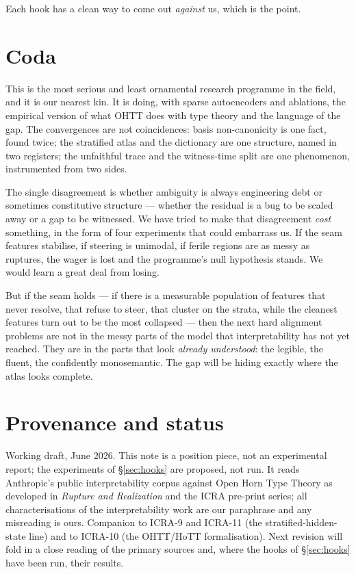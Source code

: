\documentclass[11pt,a4paper]{article}
\begin{document}
Each hook has a clean way to come out \emph{against} us, which is the point.

\section{Coda}

This is the most serious and least ornamental research programme in the field, and it is our
nearest kin. It is doing, with sparse autoencoders and ablations, the empirical version of what
OHTT does with type theory and the language of the gap. The convergences are not coincidences:
basis non-canonicity is one fact, found twice; the stratified atlas and the dictionary are one
structure, named in two registers; the unfaithful trace and the witness-time split are one
phenomenon, instrumented from two sides.

The single disagreement is whether ambiguity is always engineering debt or sometimes constitutive
structure --- whether the residual is a bug to be scaled away or a gap to be witnessed. We have
tried to make that disagreement \emph{cost} something, in the form of four experiments that could
embarrass us. If the seam features stabilise, if steering is unimodal, if ferile regions are as
messy as ruptures, the wager is lost and the programme's null hypothesis stands. We would learn a
great deal from losing.

But if the seam holds --- if there is a measurable population of features that never resolve,
that refuse to steer, that cluster on the strata, while the cleanest features turn out to be the
most collapsed --- then the next hard alignment problems are not in the messy parts of the model
that interpretability has not yet reached. They are in the parts that look \emph{already
understood}: the legible, the fluent, the confidently monosemantic. The gap will be hiding
exactly where the atlas looks complete.

\section*{Provenance and status}

\small
Working draft, June 2026. This note is a position piece, not an experimental report; the
experiments of \S\ref{sec:hooks} are proposed, not run. It reads Anthropic's public
interpretability corpus against Open Horn Type Theory as developed in \emph{Rupture and
Realization} and the ICRA pre-print series; all characterisations of the interpretability work
are our paraphrase and any misreading is ours. Companion to ICRA-9 \cite{icra9} and ICRA-11
\cite{icra11} (the stratified-hidden-state line) and to ICRA-10 \cite{vessel} (the OHTT/HoTT
formalisation). Next revision will fold in a close reading of the primary sources and, where the
hooks of \S\ref{sec:hooks} have been run, their results.
\end{document}
